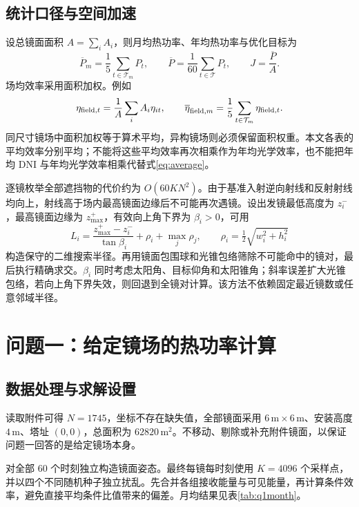 \documentclass[UTF8,a4paper,zihao=-4,fontset=mac]{ctexart}
\newcommand{\DNI}{\mathrm{DNI}}
\newcommand{\mean}[1]{\overline{#1}}
\begin{document}
\subsection{统计口径与空间加速}
设总镜面面积 $A=\sum_i A_i$，则月均热功率、年均热功率与优化目标为
\begin{equation}
\mean P_m=\frac15\sum_{t\in\mathcal T_m}P_t,\qquad
\mean P=\frac1{60}\sum_{t\in\mathcal T}P_t,\qquad J=\frac{\mean P}{A}.
\label{eq:average}
\end{equation}
场均效率采用面积加权。例如
\begin{equation}
\eta_{{\rm field},t}=\frac1A\sum_i A_i\eta_{it},\qquad
\mean\eta_{{\rm field},m}=\frac15\sum_{t\in\mathcal T_m}\eta_{{\rm field},t}.
\end{equation}
同尺寸镜场中面积加权等于算术平均，异构镜场则必须保留面积权重。本文各表的平均效率分别平均；不能将这些平均效率再次相乘作为年均光学效率，也不能把年均 $\DNI$ 与年均光学效率相乘代替式\eqref{eq:average}。

逐镜枚举全部遮挡物的代价约为 $O(60KN^2)$。由于基准入射逆向射线和反射射线均向上，射线高于场内最高镜面边缘后不可能再次遇镜。设出发镜最低高度为 $z_i^{-}$，最高镜面边缘为 $z_{\max}^{+}$，有效向上角下界为 $\beta_i>0$，可用
\begin{equation}
L_i=\frac{z_{\max}^{+}-z_i^{-}}{\tan\beta_i}+\rho_i+\max_j\rho_j,
\qquad \rho_i=\tfrac12\sqrt{w_i^2+h_i^2}
\end{equation}
构造保守的二维搜索半径。再用镜面包围球和光锥包络筛除不可能命中的镜对，最后执行精确求交。$\beta_i$ 同时考虑太阳角、目标仰角和太阳锥角；斜率误差扩大光锥包络，若向上角下界失效，则回退到全镜对计算。该方法不依赖固定最近镜数或任意邻域半径。

\section{问题一：给定镜场的热功率计算}
\subsection{数据处理与求解设置}
读取附件可得 $N=1745$，坐标不存在缺失值，全部镜面采用 $6\,\mathrm m\times6\,\mathrm m$、安装高度 $4\,\mathrm m$、塔址 $(0,0)$，总面积为 $62820\,\mathrm{m}^2$。不移动、剔除或补充附件镜面，以保证问题一回答的是给定镜场本身。

对全部 $60$ 个时刻独立构造镜面姿态。最终每镜每时刻使用 $K=4096$ 个采样点，并以四个不同随机种子独立扰乱。先合并各组接收能量与可见能量，再计算条件效率，避免直接平均条件比值带来的偏差。月均结果见表\ref{tab:q1month}。
\end{document}
